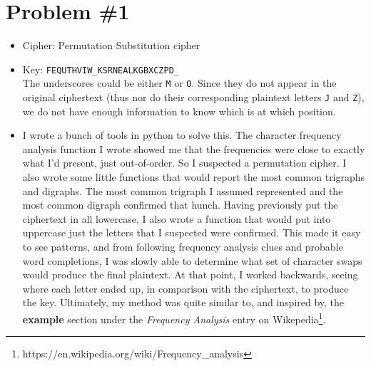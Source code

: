 \documentclass[conference]{IEEEtran}
\begin{document}




%
\IEEEpeerreviewmaketitle



\section{Problem \#1}
\begin{itemize}
  \item Cipher: Permutation Substitution cipher
  \item Key: \verb|FEQUTHVIW_KSRNEALKGBXCZPD_|\\
    The underscores could be either \verb|M| or \verb|O|. Since they do not appear
    in the original ciphertext (thus nor do their corresponding plaintext
    letters \verb|J| and \verb|Z|), we do not have enough information to
    know which is at which position.
  \item I wrote a bunch of tools in python to solve this. The character
    frequency analysis function I wrote showed me that the frequencies
    were close to exactly what I'd present, just out-of-order. 
    So I suspected a permutation cipher.  I also wrote some little functions
    that would report the most common trigraphs and digraphs. The most
    common trigraph I assumed represented and the most common
    digraph confirmed that hunch. Having previously put the ciphertext in
    all lowercase, I also wrote a function that would put into uppercase
    just the letters that I suspected were confirmed. This made it easy to
    see patterns, and from following frequency analysis clues and probable
    word completions, I was slowly able to determine what set of character swaps
    would produce the final plaintext. At that point, I worked backwards,
    seeing where each letter ended up, in comparison with the ciphertext,
    to produce the key. Ultimately, my method was quite similar to, and inspired
    by, the \textbf{example} section under the \textit{Frequency Analysis} entry
    on Wikepedia\footnote{https://en.wikipedia.org/wiki/Frequency\_analysis}.
\end{itemize}
\end{document}
